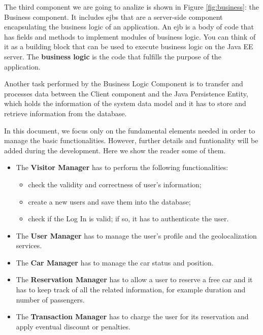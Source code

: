 \newline
The third component we are going to analize is shown in Figure \ref{fig:business}: the Business component. It includes \acl{ejb}s that are a server-side component encapsulating the business logic of an application. An \acs{ejb} is a body of code that has fields and methods to implement modules of business logic. You can think of it as a building block that can be used to execute business logic on the Java EE server.
The \textbf{business logic} is the code that fulfills the purpose of the application.

Another task performed by the Business Logic Component is to transfer and processes data between the Client component and the Java Persistence Entity, which holds the information of the system data model and it has to store and retrieve information from the database.

In this document, we focus only on the fundamental elements needed in order to manage the basic functionalities. However, further details and funtionality will be added during the development. Here we show the reader some of them.

\begin{itemize}
\item The \textbf{Visitor Manager} has to perform the following functionalities:
	\begin{itemize}
	\item check the validity and correctness of user's information;
	\item create a new users and save them into the database;
	\item check if the Log In is valid; if so, it has to authenticate the user.
	\end{itemize}
\item The \textbf{User Manager} has to manage the user's profile and the geolocalization services.
\item The \textbf{Car Manager} has to manage the car status and position.
\item The \textbf{Reservation Manager} has to allow a user to reserve a free car and it has to keep track of all the related information, for example duration and number of passengers.
\item The \textbf{Transaction Manager} has to charge the user for its reservation and apply eventual discount or penalties.
\end{itemize}
\clearpage

